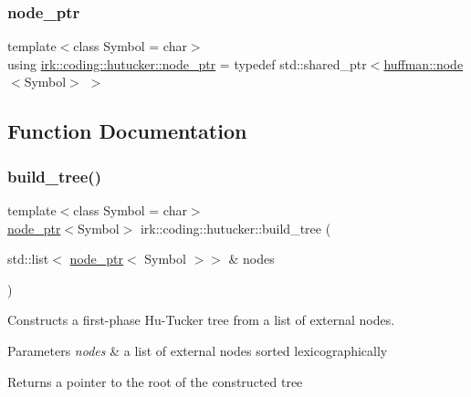 \subsubsection{\texorpdfstring{node\+\_\+ptr}{node\_ptr}}
{\footnotesize\ttfamily template$<$class Symbol  = char$>$ \\
using \mbox{\hyperlink{namespaceirk_1_1coding_1_1hutucker_aa5d22cfdf05ffec38f2531e0307248fe}{irk\+::coding\+::hutucker\+::node\+\_\+ptr}} = typedef std\+::shared\+\_\+ptr$<$\mbox{\hyperlink{structirk_1_1coding_1_1huffman_1_1node}{huffman\+::node}}$<$Symbol$>$ $>$}



\subsection{Function Documentation}
\mbox{\label{namespaceirk_1_1coding_1_1hutucker_ae962db3e3b0d823d81dd74c57e129887}} 
\subsubsection{\texorpdfstring{build\+\_\+tree()}{build\_tree()}}
{\footnotesize\ttfamily template$<$class Symbol  = char$>$ \\
\mbox{\hyperlink{namespaceirk_1_1coding_1_1hutucker_aa5d22cfdf05ffec38f2531e0307248fe}{node\+\_\+ptr}}$<$Symbol$>$ irk\+::coding\+::hutucker\+::build\+\_\+tree (\begin{DoxyParamCaption}\item[{std\+::list$<$ \mbox{\hyperlink{namespaceirk_1_1coding_1_1hutucker_aa5d22cfdf05ffec38f2531e0307248fe}{node\+\_\+ptr}}$<$ Symbol $>$$>$ \&}]{nodes }\end{DoxyParamCaption})}



Constructs a first-\/phase Hu-\/\+Tucker tree from a list of external nodes. 


\begin{DoxyParams}{Parameters}
{\em nodes} & a list of external nodes sorted lexicographically \\
\hline
\end{DoxyParams}
\begin{DoxyReturn}{Returns}
a pointer to the root of the constructed tree 
\end{DoxyReturn}
\mbox{\label{namespaceirk_1_1coding_1_1hutucker_a92ab334d2417de57e7ac803d32e751d5}} 
